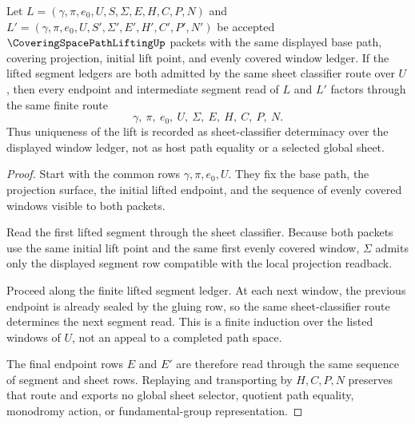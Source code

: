 \begin{theorem}
\label{thm:covering-space-path-lifting-unique-lift-route}
Let $L=(\gamma,\pi,e_0,U,S,\Sigma,E,H,C,P,N)$ and $L'=(\gamma,\pi,e_0,U,S',\Sigma',E',H',C',P',N')$ be accepted $\CoveringSpacePathLiftingUp$ packets with the same displayed base path, covering projection, initial lift point, and evenly covered window ledger. If the lifted segment ledgers are both admitted by the same sheet classifier route over $U$, then every endpoint and intermediate segment read of $L$ and $L'$ factors through the same finite route
$$
\gamma,\ \pi,\ e_0,\ U,\ \Sigma,\ E,\ H,\ C,\ P,\ N .
$$
Thus uniqueness of the lift is recorded as sheet-classifier determinacy over the displayed window ledger, not as host path equality or a selected global sheet.
\end{theorem}
\begin{proof}
Start with the common rows $\gamma,\pi,e_0,U$. They fix the base path, the projection surface, the initial lifted endpoint, and the sequence of evenly covered windows visible to both packets.

Read the first lifted segment through the sheet classifier. Because both packets use the same initial lift point and the same first evenly covered window, $\Sigma$ admits only the displayed segment row compatible with the local projection readback.

Proceed along the finite lifted segment ledger. At each next window, the previous endpoint is already sealed by the gluing row, so the same sheet-classifier route determines the next segment read. This is a finite induction over the listed windows of $U$, not an appeal to a completed path space.

The final endpoint rows $E$ and $E'$ are therefore read through the same sequence of segment and sheet rows. Replaying and transporting by $H,C,P,N$ preserves that route and exports no global sheet selector, quotient path equality, monodromy action, or fundamental-group representation.
\end{proof}

